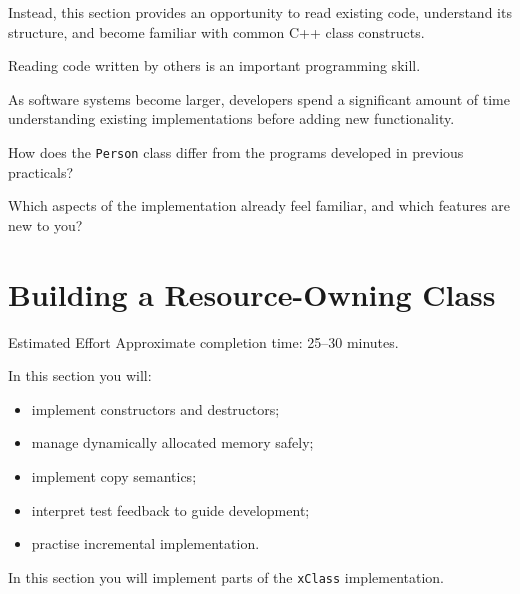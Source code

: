 \documentclass{csc2059practical}
\begin{document}
Instead, this section provides an opportunity to read existing code,
understand its structure, and become familiar with common C++ class
constructs.

\begin{tipbox}

Reading code written by others is an important programming skill.

As software systems become larger, developers spend a significant
amount of time understanding existing implementations before adding
new functionality.

\end{tipbox}

\begin{reflectionbox}

How does the \texttt{Person} class differ from the programs developed
in previous practicals?

Which aspects of the implementation already feel familiar, and which
features are new to you?

\end{reflectionbox}

\section{Building a Resource-Owning Class}

\begin{infobox}{Estimated Effort}
Approximate completion time: 25--30 minutes.
\end{infobox}

\begin{learningoutcomes}
    In this section you will:
\begin{itemize}

    
    \item implement constructors and destructors;
    \item manage dynamically allocated memory safely;
    \item implement copy semantics;
    \item interpret test feedback to guide development;
    \item practise incremental implementation.
\end{itemize}
\end{learningoutcomes}

In this section you will implement parts of the
\texttt{xClass} implementation.
\end{document}
